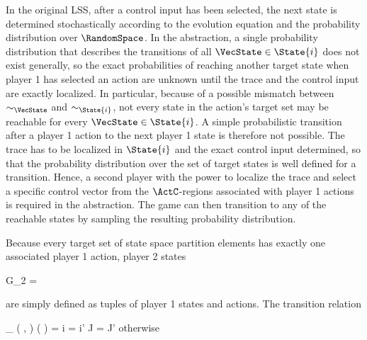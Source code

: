\stopsubsection


\startsubsection[title={Player 2},reference=sec:abstraction-graph-playertwo]

    In the original LSS, after a control input has been selected, the next state is determined stochastically according to the evolution equation and the probability distribution over $\RandomSpace$.
    In the abstraction, a single probability distribution that describes the transitions of all $\VecState \in \State{i}$ does not exist generally, so the exact probabilities of reaching another target state when player 1 has selected an action are unknown until the trace and the control input are exactly localized.
    In particular, because of a possible mismatch between $\sim_\VecState$ and $\sim_{\State{i}}$, not every state in the action's target set may be reachable for every $\VecState \in \State{i}$.
    A simple probabilistic transition after a player 1 action to the next player 1 state is therefore not possible.
    The trace has to be localized in $\State{i}$ and the exact control input determined, so that the probability distribution over the set of target states is well defined for a transition.
    Hence, a second player with the power to localize the trace and select a specific control vector from the $\ActC$-regions associated with player 1 actions is required in the abstraction.
    The game can then transition to any of the reachable states by sampling the resulting probability distribution.

    Because every target set of state space partition elements has exactly one associated player 1 action, player 2 states

    \startformula
        G_2 = 
    \stopformula

    are simply defined as tuples of player 1 states and actions.
    The transition relation

    \startformula
        \Transition_\GameGraph
            \Big( ,  \Big)
            \Big(  \Big)
        = \startmathcases
            \MC \startgathered
                    \NC \StartIf i = i' \MidAnd J = J'
                    \NR
                    \NC \quad \MidAnd {} \neq \emptyset
                    \NR
                \stopgathered
            \NR
            \NC otherwise
            \NR
        \stopmathcases
    \stopformula

